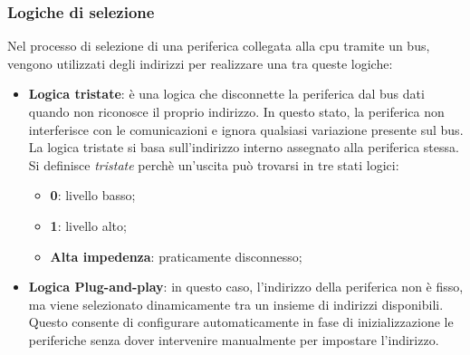 \subsubsection{Logiche di selezione}
Nel processo di selezione di una periferica collegata alla cpu tramite un bus, vengono utilizzati degli indirizzi per realizzare una tra queste logiche:
\begin{itemize}
    \item \textbf{Logica tristate}: è una logica che disconnette la periferica dal bus dati quando non riconosce il proprio indirizzo. In questo stato, la periferica non interferisce con le comunicazioni e ignora qualsiasi variazione presente sul bus. La logica tristate si basa sull'indirizzo interno assegnato alla periferica stessa. Si definisce \textit{tristate} perchè un'uscita può trovarsi in tre stati logici:
    \begin{itemize}
        \item \textbf{0}: livello basso;
        \item \textbf{1}: livello alto;
        \item \textbf{Alta impedenza}: praticamente disconnesso; 
    \end{itemize}
    \item \textbf{Logica Plug-and-play}: in questo caso, l'indirizzo della periferica non è fisso, ma viene selezionato dinamicamente tra un insieme di indirizzi disponibili. Questo consente di configurare automaticamente in fase di inizializzazione le periferiche senza dover intervenire manualmente per impostare l'indirizzo.
\end{itemize}

